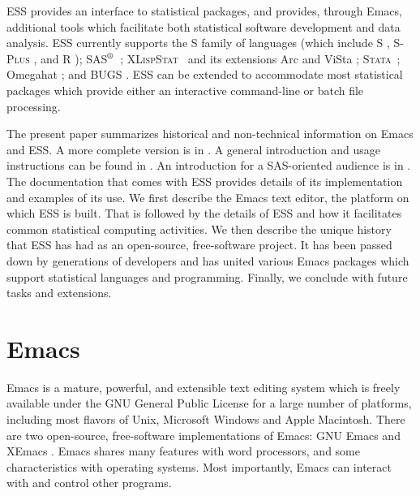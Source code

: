 \documentclass{article}
\newcommand*{\SAS}{\textsc{SAS}$^{\mbox{\scriptsize\textregistered}}$}
\newcommand*{\Splus}{\textsc{S-Plus}}
\newcommand*{\XLispStat}{\textsc{XLispStat}}
\newcommand*{\Stata}{\textsc{Stata}}
\begin{document}
ESS provides an interface to statistical packages, and provides,
through Emacs, additional tools which facilitate both statistical
software development and data analysis.  ESS currently supports
the S family of languages (which include
S \citep{BecRCW88,ChaJH92,ChaJ98}, \Splus{} \citep{Splus}, and R
\citep{ihak:gent:1996}); \SAS\ \citep{SAS:8}; \XLispStat\
\citep{Tier90} and its extensions Arc \citep{Cook:Weisberg:1999} and
ViSta \citep{youn:fald:mcfa:1992}; \Stata\ \citep{Stata:6.0}; Omegahat
\citep{DTLang:2000}; and BUGS \citep{BUGS}.  ESS can be
extended to accommodate most statistical packages which provide either
an interactive command-line or batch file processing.

The present paper summarizes historical and non-technical information on
Emacs and ESS.  A more complete version is in \citep{RMHHS:2001}.
A general introduction and usage instructions can be
found in \citep{heiberger:dsc:2001}.  
An introduction for a SAS-oriented audience is in
\citep{heiberger:philasugi:2001}.  The documentation that comes with
ESS provides details of its implementation and examples of its use.
We first describe the Emacs text editor, the platform on which ESS is
built.  That is followed by the details of ESS and how it facilitates
common statistical computing activities.  We then describe the unique
history that ESS has had as an open-source, free-software project.
It has been passed down by generations of developers and has
united various Emacs packages which support
statistical languages and programming.  Finally, we conclude with
future tasks and extensions.

\section{Emacs}
\label{sec:emacs}

Emacs is a mature, powerful, and extensible text editing system which
is freely available under the GNU General Public License for a large
number of platforms, including most flavors of Unix, Microsoft Windows
and Apple Macintosh.  There are two open-source, free-software
implementations of Emacs:  GNU Emacs \citep{GNU-Emacs} and XEmacs
\citep{XEmacs}.  Emacs shares many features with
word processors, and some characteristics with operating systems.
Most importantly, Emacs can interact with and control other programs.
\end{document}

